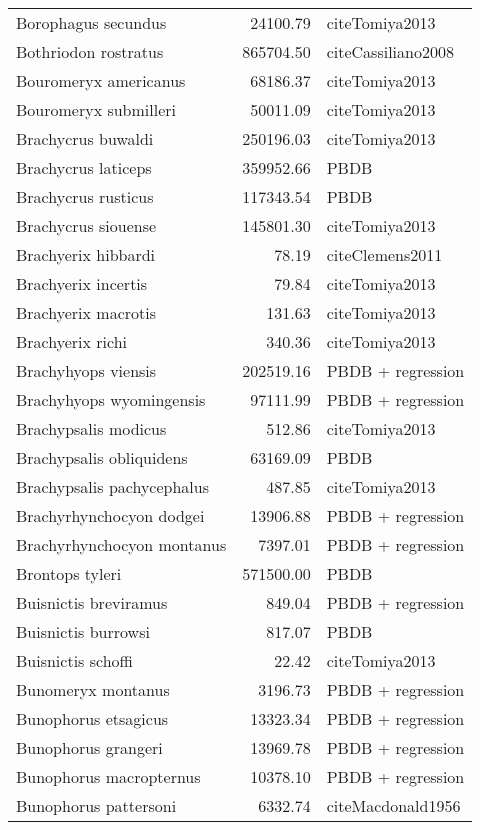 \begin{table}[ht]
\begin{tabular}{lrl}
  Borophagus secundus & 24100.79 & cite{Tomiya2013} \\ 
  Bothriodon rostratus & 865704.50 & cite{Cassiliano2008} \\ 
  Bouromeryx americanus & 68186.37 & cite{Tomiya2013} \\ 
  Bouromeryx submilleri & 50011.09 & cite{Tomiya2013} \\ 
  Brachycrus buwaldi & 250196.03 & cite{Tomiya2013} \\ 
  Brachycrus laticeps & 359952.66 & PBDB \\ 
  Brachycrus rusticus & 117343.54 & PBDB \\ 
  Brachycrus siouense & 145801.30 & cite{Tomiya2013} \\ 
  Brachyerix hibbardi & 78.19 & cite{Clemens2011} \\ 
  Brachyerix incertis & 79.84 & cite{Tomiya2013} \\ 
  Brachyerix macrotis & 131.63 & cite{Tomiya2013} \\ 
  Brachyerix richi & 340.36 & cite{Tomiya2013} \\ 
  Brachyhyops viensis & 202519.16 & PBDB + regression \\ 
  Brachyhyops wyomingensis & 97111.99 & PBDB + regression \\ 
  Brachypsalis modicus & 512.86 & cite{Tomiya2013} \\ 
  Brachypsalis obliquidens & 63169.09 & PBDB \\ 
  Brachypsalis pachycephalus & 487.85 & cite{Tomiya2013} \\ 
  Brachyrhynchocyon dodgei & 13906.88 & PBDB + regression \\ 
  Brachyrhynchocyon montanus & 7397.01 & PBDB + regression \\ 
  Brontops tyleri & 571500.00 & PBDB \\ 
  Buisnictis breviramus & 849.04 & PBDB + regression \\ 
  Buisnictis burrowsi & 817.07 & PBDB \\ 
  Buisnictis schoffi & 22.42 & cite{Tomiya2013} \\ 
  Bunomeryx montanus & 3196.73 & PBDB + regression \\ 
  Bunophorus etsagicus & 13323.34 & PBDB + regression \\ 
  Bunophorus grangeri & 13969.78 & PBDB + regression \\ 
  Bunophorus macropternus & 10378.10 & PBDB + regression \\ 
  Bunophorus pattersoni & 6332.74 & cite{Macdonald1956} \\ 

\end{tabular}
\end{table}
